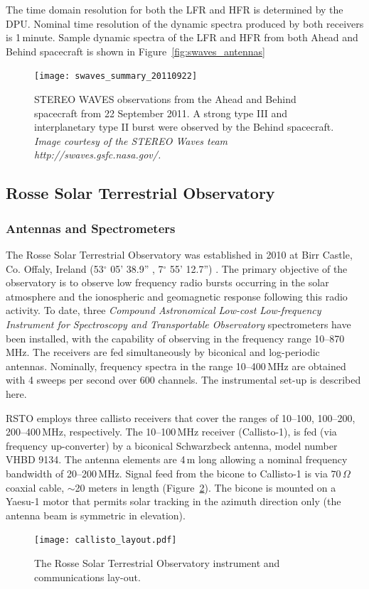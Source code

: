 The time domain resolution for both the LFR and HFR is determined by the DPU. Nominal time resolution of the dynamic spectra produced by both receivers is 1\,minute. Sample dynamic spectra of the LFR and HFR from both Ahead and Behind spacecraft is shown in Figure~\ref{fig:swaves_antennas}
\begin{figure}
\centering
\texttt{[image: swaves\_summary\_20110922]}
\caption[STEREO WAVES observations]{STEREO WAVES observations from the Ahead and Behind spacecraft from 22 September 2011. A strong type III and interplanetary type II burst were observed by the Behind spacecraft. {\it Image courtesy of the STEREO Waves team http://swaves.gsfc.nasa.gov/.}}
\label{fig:swaves_typeIIIs}
\end{figure}


\subsection{Rosse Solar Terrestrial Observatory}\label{sec:30}

\subsubsection{Antennas and Spectrometers}
The Rosse Solar Terrestrial Observatory was established in 2010 at Birr Castle, Co. Offaly, Ireland (53$^{\circ}$ 05' 38.9'' , 7$^{\circ}$ 55' 12.7'') \citep{zucca2012}. The primary objective of the observatory is to observe low frequency radio bursts occurring in the solar atmosphere and the ionospheric and geomagnetic response following this radio activity.  To date, three \textit{Compound Astronomical Low-cost Low-frequency Instrument for Spectroscopy and Transportable Observatory} \citep[CALLISTO;][]{Benz2005} spectrometers have been installed, with the capability of observing in the frequency range 10--870\,MHz. The receivers are fed simultaneously by biconical and log-periodic antennas. Nominally, frequency spectra in the range 10--400\,MHz are obtained with 4 sweeps per second over 600 channels. The instrumental set-up is described here.

RSTO employs three callisto receivers that cover the ranges of 10--100, 100--200, 200--400\,MHz, respectively. The 10--100\,MHz receiver (Callisto-1), is fed (via frequency up-converter) by a biconical Schwarzbeck antenna, model number VHBD 9134. The antenna elements are 4\,m long allowing a nominal frequency bandwidth of 20--200\,MHz. Signal feed from the bicone to Callisto-1 is via $70\,\Omega$ coaxial cable, $\sim$20 meters in length (Figure~\ref{fig:rsto_layout}). The bicone is mounted on a Yaesu-1 motor that permits solar tracking in the azimuth direction only (the antenna beam is symmetric in elevation). 
\begin{figure}
    \centering
\texttt{[image: callisto\_layout.pdf]}
\caption[RSTO Instrumental Setup]{The Rosse Solar Terrestrial Observatory instrument and communications lay-out.}
\label{fig:rsto_layout}
\end{figure}

